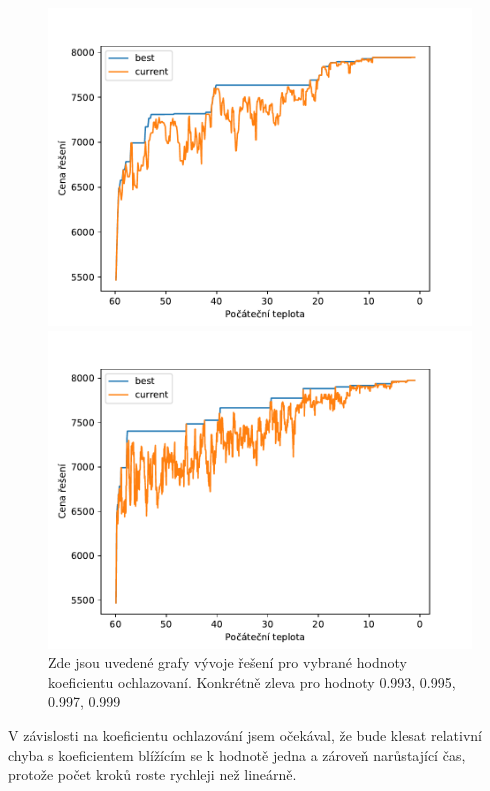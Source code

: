 \documentclass[11pt]{article}
\begin{document}
\begin{figure}
\begin{minipage}[c]{0.48\textwidth}
        \centering \includegraphics[width=\textwidth]{img/997.pdf} 
    \end{minipage}
    \begin{minipage}[c]{0.48\textwidth}
        \centering \includegraphics[width=\textwidth]{img/999.pdf} 
    \end{minipage}
   \caption{Zde jsou uvedené grafy vývoje řešení pro vybrané hodnoty koeficientu ochlazovaní. Konkrétně zleva pro hodnoty 0.993, 0.995, 0.997, 0.999}\label{fig:GVPK}
\end{figure} 

V závislosti na koeficientu ochlazování jsem očekával, že bude klesat relativní chyba s koeficientem blížícím se k hodnotě jedna a zároveň narůstající čas, protože počet kroků roste rychleji než lineárně. 
\end{document}
